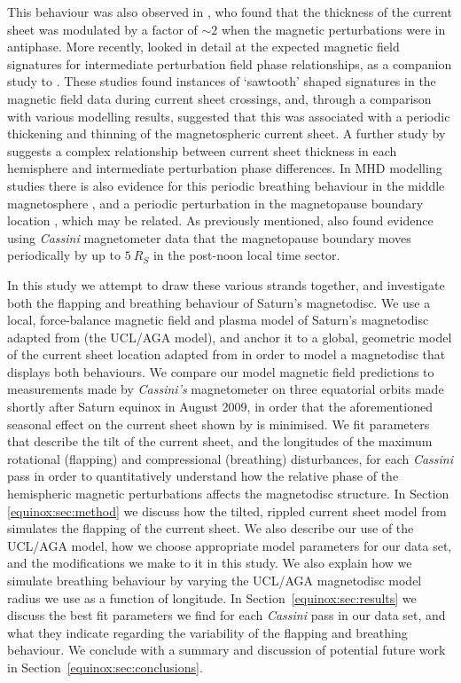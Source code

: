 This behaviour was also observed in \citet{provan2012}, who found that the thickness of the current sheet was modulated by a factor of ${\sim}2$ when the magnetic perturbations were in antiphase. More recently, \citet{thomsen2017} looked in detail at the expected magnetic field signatures for intermediate perturbation field phase relationships, as a companion study to \citet{cowley2017a}. These studies found instances of `sawtooth' shaped signatures in the magnetic field data during current sheet crossings, and, through a comparison with various modelling results, suggested that this was associated with a periodic thickening and thinning of the magnetospheric current sheet. A further study by \citet{cowley2017b} suggests a complex relationship between current sheet thickness in each hemisphere and intermediate perturbation phase differences. In MHD modelling studies there is also evidence for this periodic breathing behaviour in the middle magnetosphere \citep{ramer2016}, and a periodic perturbation in the magnetopause boundary location \citep{kivelson2014}, which may be related. As previously mentioned, \citet{clarke2010} also found evidence using \textit{Cassini} magnetometer data that the magnetopause boundary moves periodically by up to $\SI{5}{R_S}$ in the post-noon local time sector.

In this study we attempt to draw these various strands together, and investigate both the flapping and breathing behaviour of Saturn's magnetodisc. We use a local, force-balance magnetic field and plasma model of Saturn's magnetodisc adapted from \citet{achilleos2010a} (the UCL/AGA model), and anchor it to a global, geometric model of the current sheet location adapted from \citet{arridge2011} in order to model a magnetodisc that displays both behaviours. We compare our model magnetic field predictions to measurements made by \textit{Cassini's} magnetometer on three equatorial orbits made shortly after Saturn equinox in August 2009, in order that the aforementioned seasonal effect on the current sheet shown by \citet{arridge2008warp} is minimised. We fit parameters that describe the tilt of the current sheet, and the longitudes of the maximum rotational (flapping) and compressional (breathing) disturbances, for each \textit{Cassini} pass in order to quantitatively understand how the relative phase of the hemispheric magnetic perturbations affects the magnetodisc structure. In Section \ref{equinox:sec:method} we discuss how the tilted, rippled current sheet model from \cite{arridge2011} simulates the flapping of the current sheet. We also describe our use of the UCL/AGA model, how we choose appropriate model parameters for our data set, and the modifications we make to it in this study. We also explain how we simulate breathing behaviour by varying the UCL/AGA magnetodisc model radius we use as a function of longitude. In Section~\ref{equinox:sec:results} we discuss the best fit parameters we find for each \textit{Cassini} pass in our data set, and what they indicate regarding the variability of the flapping and breathing behaviour. We conclude with a summary and discussion of potential future work in Section~\ref{equinox:sec:conclusions}.

